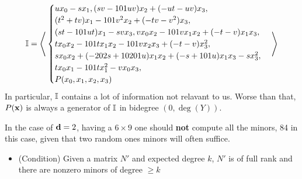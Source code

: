 \documentclass[]{beamer}
\begin{document}
\begin{frame}
\begin{example}
	\[
		\mathbb{I}=\Bigg\langle
		\begin{cases}
		u {x}_{0}-s {x}_{1},
		(s v-101 u v) {x}_{2}+(-u t-u v){x}_{3},\\
		(t^{2}+t v) {x}_{1}-101 v^{2} {x}_{2}+(-t v-v^{2}) {x}_{3},\\
		(s t-101 ut) {x}_{1}-s v {x}_{3},v {x}_{0} {x}_{2}-101 v {x}_{1} {x}_{2}+(-t-v) {x}_{1}{x}_{3},\\
	  	t {x}_{0} {x}_{2}-101 t {x}_{1} {x}_{2}-101 v {x}_{2} {x}_{3}+(-t-v){x}_{3}^{2},\\
	  	s {x}_{0} {x}_{2}+(-202 s+10201 u) {x}_{1} {x}_{2}+(-s+101 u){x}_{1} {x}_{3}-s {x}_{3}^{2},\\
		t {x}_{0} {x}_{1}-101 t {x}_{1}^{2}-v {x}_{0}{x}_{3},\\P(x_0,x_1,x_2,x_3)
		\end{cases}\Bigg\rangle
	\]
	In particular, $\mathbb{I}$ contains a lot of information not relavant to us.
	Worse than that, $P(\mathbf x)$ is always a generator of $\mathbb{I}$ in bidegree $(0,\deg(Y))$.
\end{example}
\begin{example}
	In the case of $\mathbf d=2$, having a $6\times9$ one should {\bf not} compute all the minors,
	84 in this case, given that two random ones minors will often suffice.
\end{example}
\end{frame}

\begin{frame}
\begin{algorithm}
\begin{algorithmic}
	\EndWhile
\end{algorithmic}
\end{algorithm}

\begin{itemize}
	\item[] (Condition) Given a matrix $N'$ and expected degree $k$, $N'$ is of full rank and there
	are nonzero minors of degree $\geq k$
\end{itemize}
\end{frame}
\end{document}
